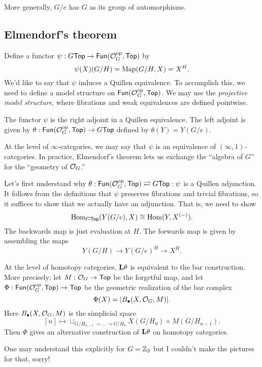 \documentclass{article}
\begin{document}
More generally, $G/e$ has $G$ as its group of automorphisms.

\subsection{Elmendorf's theorem}

Define a functor $\psi: G\mathsf{Top} \to \mathsf{Fun}(\mathcal{O}_G^{\mathrm{op}}, \mathsf{Top})$ by 
\[
  \psi(X)(G/H) = \operatorname{Map}(G/H, X) = X^H.
\]
We'd like to say that $\psi$ induces a Quillen equivalence.
To accomplish this, we need to define a model structure on $\mathsf{Fun}(\mathcal{O}_G^{\mathrm{op}}, \mathsf{Top})$.
We may use the \emph{projective model structure}, where fibrations and weak equivalences are defined pointwise.

\begin{thm}[Elmendorf]
  The functor $\psi$ is the right adjoint in a Quillen equivalence.
  The left adjoint is given by $\theta: \mathsf{Fun}(\mathcal{O}_G^{\mathrm{op}}, \mathsf{Top}) \to G\mathsf{Top}$ defined by $\theta(Y) = Y(G / e)$.
\end{thm}

At the level of $\infty$-categories, we may say that $\psi$ is an equivalence of $(\infty, 1)$-categories.
In practice, Elmendorf's theorem lets us exchange the ``algebra of $G$'' for the ``geometry of $\mathcal{O}_G$.''

Let's first understand why $\theta: \mathsf{Fun}(\mathcal{O}_G^{\mathrm{op}}, \mathsf{Top}) \rightleftarrows G\mathsf{Top} :\psi$ is a Quillen adjunction.
It follows from the definitions that $\psi$ preserves fibrations and trivial fibrations, so it suffices to show that we actually have an adjunction.
That is, we need to show
\[
  \operatorname{Hom}_{G\mathsf{Top}}(Y(G/e), X) \cong \operatorname{Hom}(Y, X^{(-)}).
\]
The backwards map is just evaluation at $H$.
The forwards map is given by assembling the maps
\[
  Y(G/H) \to Y(G/e)^H \to X^H.
\]

At the level of homotopy categories, $\mathbf{L} \theta$ is equivalent to the bar construction.
More precisely: let $M: \mathcal{O}_G \to \mathsf{Top}$ be the forgetful map, and let $\Phi: \mathsf{Fun}(\mathcal{O}_G^{\mathrm{op}}, \mathsf{Top}) \to \mathsf{Top}$ be the geometric realization of the bar complex
\[
  \Phi(X) = |B_\bullet(X, \mathcal{O}_G, M)|.
\]
Here $B_\bullet(X, \mathcal{O}_G, M)$ is the simplicial space
\[
  [n] \mapsto \sqcup_{G / H_{n-1} \to \dots \to G / H_0} X(G / H_0) \times M(G / H_{n-1}).
\]
Then $\Phi$ gives an alternative construction of $\mathbf{L} \theta$ on homotopy categories.

One may understand this explicitly for $G = \mathbb{Z}_2$ but I couldn't make the pictures for that, sorry!
\end{document}
